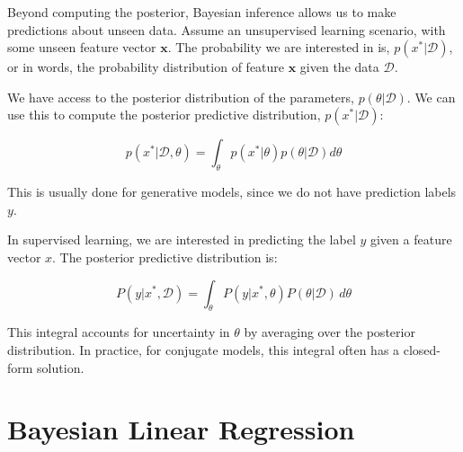 Beyond computing the posterior, Bayesian inference allows us to make predictions about unseen data. Assume an unsupervised learning scenario, with some unseen feature vector $\bm{x}$. The probability we are interested in is, $p(x^*|\mathcal{D})$, or in words, the probability distribution of feature $\bm{x}$ given the data $\mathcal{D}$. \bigskip

We have access to the posterior distribution of the parameters, $p(\theta|\mathcal{D})$. We can use this to compute the posterior predictive distribution, $p(x^*|\mathcal{D})$:

\[
    p(x^{*}|{\mathcal D},\theta)=\int_{\theta}p(x^{*}|\theta)p(\theta|{\mathcal D})d\theta
\]

This is usually done for generative models, since we do not have prediction labels $y$.\bigskip

In supervised learning, we are interested in predicting the label $y$ given a feature vector $x$. The posterior predictive distribution is:

\[
    P(y|x^*, \mathcal{D}) = \int_{\theta} P(y|x^*, \theta) P(\theta|\mathcal{D}) \, d\theta
\]

This integral accounts for uncertainty in \( \theta \) by averaging over the posterior distribution. In practice, for conjugate models, this integral often has a closed-form solution.

\section{Bayesian Linear Regression}




